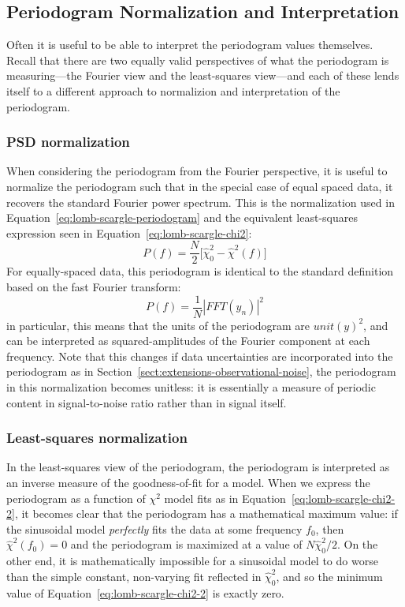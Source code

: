 \documentclass[preprint]{aastex}
\newcommand{\Eq}[1]{Equation~\ref{eq:#1}}
\newcommand{\eq}[1]{\Eq{#1}}
\newcommand{\eqlabel}[1]{\label{eq:#1}}
\newcommand{\Sect}[1]{Section~\ref{sect:#1}}
\newcommand{\sect}[1]{\Sect{#1}}
\newcommand{\sectlabel}[1]{\label{sect:#1}}
\begin{document}
\subsection{Periodogram Normalization and Interpretation}
\sectlabel{normalizations}

Often it is useful to be able to interpret the periodogram values themselves.
Recall that there are two equally valid perspectives of what the periodogram
is measuring---the Fourier view and the least-squares view---and each of these
lends itself to a different approach to normalizion and interpretation of the
periodogram.

\subsubsection{PSD normalization}
When considering the periodogram from the Fourier perspective,
it is useful to normalize the periodogram such that in the special case
of equal spaced data, it recovers the standard Fourier power spectrum.
This is the normalization used in \eq{lomb-scargle-periodogram} and the
equivalent least-squares expression seen in \eq{lomb-scargle-chi2}:
\begin{equation}
  P(f) = \frac{N}{2}\big[\hat{\chi}^2_0 - \hat{\chi}^2(f)\big]
  \eqlabel{lomb-scargle-chi2-2}
\end{equation}
For equally-spaced data, this periodogram is identical to the standard
definition based on the fast Fourier transform:
\begin{equation}
  P(f) = \frac{1}{N} \left| FFT(y_n) \right|^2
\end{equation}
in particular, this means that the units of the periodogram are $unit(y)^2$,
and can be interpreted as squared-amplitudes of the Fourier component at
each frequency.
Note that this changes if data uncertainties are incorporated into
the periodogram as in \sect{extensions-observational-noise},
the periodogram in this normalization becomes unitless: it is essentially
a measure of periodic content in signal-to-noise ratio
rather than in signal itself.

\subsubsection{Least-squares normalization}
In the least-squares view of the periodogram, the periodogram is interpreted
as an inverse measure of the goodness-of-fit for a model.
When we express the periodogram as a function of $\chi^2$ model fits as in
\eq{lomb-scargle-chi2-2}, it becomes clear that the periodogram has a
mathematical maximum value: if the sinusoidal model {\it perfectly} fits
the data at some frequency $f_0$, then $\hat{\chi}^2(f_0) = 0$ and the
periodogram is maximized at a value of $N\hat{\chi}^2_0 / 2$.
On the other end, it is mathematically impossible for a sinusoidal model to
do worse than the simple constant, non-varying fit reflected in
$\hat{\chi}^2_0$, and so the minimum value of \eq{lomb-scargle-chi2-2} is
exactly zero.
\end{document}
